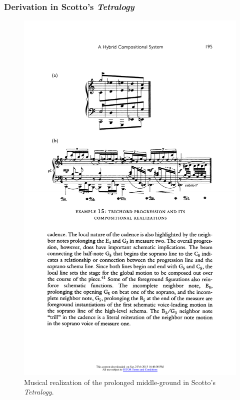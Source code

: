 \begin{frame}
	\frametitle{Derivation in Scotto's \emph{Tetralogy}}
	\begin{figure}
    	\centering
    	\includegraphics[width=\textwidth]{figures/scotto-music2.pdf}
    	\caption{Musical realization of the prolonged middle-ground in Scotto's \emph{Tetralogy}.}
	\end{figure}
\end{frame}
